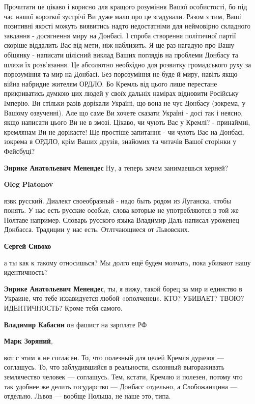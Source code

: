 \begin{itemize}
\begin{itemize}
Прочитати це цікаво і корисно для кращого розуміння Вашої особистості, бо під
час нашої короткої зустрічі Ви дуже мало про це згадували. Разом з тим, Ваші
позитивні якості можуть виявитись надто недостатніми для неймовірно складного
завдання - досягнення миру на Донбасі. І спроба створення політичної партії
скоріше віддалить Вас від мети, ніж наблизить. Я ще раз нагадую про Вашу
обіцянку - написати цілісний виклад Ваших поглядів на проблеми Донбасу та шляхи
їх розв'язання. Це абсолютно необхідно для розвитку громадського руху за
порозуміння та мир на Донбасі. Без порозуміння не буде й миру, навіть якщо
війна набридне жителям ОРДЛО. Бо Кремль від цього лише перестане прикриватись
думкою цих людей у своїх дальніх намірах відновити Російську Імперію. Ви
стільки разів дорікали Україні, що вона не чує Донбасу (зокрема, у Вашому
озвученні). Але що саме Ви хочете сказати Україні - досі так і неясно, якщо
написати цього Ви не в змозі. Цікаво, чи чують Вас у Кремлі? - принаймні,
кремлянам Ви не дорікаєте! Ще простіше запитання - чи чують Вас на Донбасі,
зокрема в ОРДЛО, крім Ваших друзів, знайомих та читачів Вашої сторінки у
Фейсбуці?

\textbf{Энрике Анатольевич Менендес}
Ну, а теперь зачем занимаешься херней?

\textbf{Oleg Platonov} 

язвк русский. Диалект своеобразный - надо быть родом из Луганска, чтобы понять.
У нас есть русские особые, слова которые не употребляются в той же Полтаве
например. Словарь русского языка Владимир Даль написал уроженец Донбасса.
Традиции у нас есть. Отлтчающиеся от Львовских.

\end{itemize} %

\textbf{Сергей Сивохо} 

а ты как к такому относишься? Мы долго ещё будем молчать, пока убивают нашу
идентичность?

\begin{itemize} %
\textbf{Энрике Анатольевич Менендес}, ты, я вижу, такой борец за мир и единство в Украине, что тебе иззавидуется любой «ополченец».
КТО?
УБИВАЕТ?
ТВОЮ?
ИДЕНТИЧНОСТЬ?
Кроме тебя самого.

\textbf{Владимир Кабасин} он фашист на зарплате РФ


\textbf{Марк Зоряний}, 

вот с этим я не согласен. То, что полезный для целей Кремля дурачок —
соглашусь. То, что заблудившийся в реальности, склонный выгораживать
землячество человек — соглашусь. Тем, кстати, Кремлю и полезен, потому что так
удобнее же делить государство — Донбасс отдельно, а Слобожанщина — отдельно.
Львов — вообще Польша, не наше это, типа.


\end{itemize}
\end{itemize}
